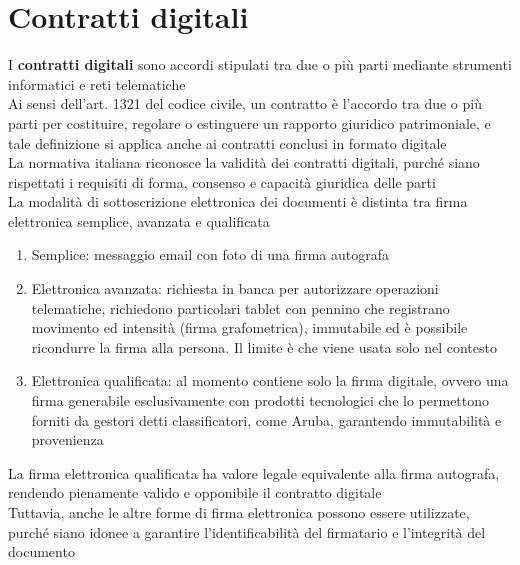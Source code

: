 \documentclass[8pt,oneside,a4paper]{article}
\begin{document}
	\section{Contratti digitali}
	I \textbf{contratti digitali} sono accordi stipulati tra due o più parti mediante strumenti informatici e reti telematiche\\
	Ai sensi dell'art. 1321 del codice civile, un contratto è l'accordo tra due o più parti per costituire, regolare o estinguere un rapporto giuridico patrimoniale, e tale definizione si applica anche ai contratti conclusi in formato digitale\\
	La normativa italiana riconosce la validità dei contratti digitali, purché siano rispettati i requisiti di forma, consenso e capacità giuridica delle parti\\
	La modalità di sottoscrizione elettronica dei documenti è distinta tra firma elettronica semplice, avanzata e qualificata\\
	\begin{enumerate}
		\item Semplice: messaggio email con foto di una firma autografa
		\item Elettronica avanzata: richiesta in banca per autorizzare operazioni telematiche, richiedono particolari tablet con pennino che registrano movimento ed intensità (firma grafometrica), immutabile ed è possibile ricondurre la firma alla persona. Il limite è che viene usata solo nel contesto
		\item Elettronica qualificata: al momento contiene solo la firma digitale, ovvero una firma generabile esclusivamente con prodotti tecnologici che lo permettono forniti da gestori detti classificatori, come Aruba, garantendo immutabilità e provenienza
	\end{enumerate}
	La firma elettronica qualificata ha valore legale equivalente alla firma autografa, rendendo pienamente valido e opponibile il contratto digitale\\
	Tuttavia, anche le altre forme di firma elettronica possono essere utilizzate, purché siano idonee a garantire l’identificabilità del firmatario e l’integrità del documento\\	
\end{document}
